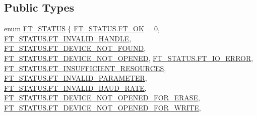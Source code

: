 \subsection*{Public Types}
\begin{DoxyCompactItemize}
\item 
enum \mbox{\hyperlink{class_f_t_d2_x_x___n_e_t_1_1_f_t_d_i_aabe20ad905cc4ccc1e35dd5b877d9a83}{F\+T\+\_\+\+S\+T\+A\+T\+US}} \{ \newline
\mbox{\hyperlink{class_f_t_d2_x_x___n_e_t_1_1_f_t_d_i_aabe20ad905cc4ccc1e35dd5b877d9a83a457bfd017cd07899da559fbfb31f0921}{F\+T\+\_\+\+S\+T\+A\+T\+U\+S.\+F\+T\+\_\+\+OK}} = 0, 
\mbox{\hyperlink{class_f_t_d2_x_x___n_e_t_1_1_f_t_d_i_aabe20ad905cc4ccc1e35dd5b877d9a83a0194e414d359539c11196a6479366791}{F\+T\+\_\+\+S\+T\+A\+T\+U\+S.\+F\+T\+\_\+\+I\+N\+V\+A\+L\+I\+D\+\_\+\+H\+A\+N\+D\+LE}}, 
\mbox{\hyperlink{class_f_t_d2_x_x___n_e_t_1_1_f_t_d_i_aabe20ad905cc4ccc1e35dd5b877d9a83a3e5bc5361c266ec83f68d8e151ef4830}{F\+T\+\_\+\+S\+T\+A\+T\+U\+S.\+F\+T\+\_\+\+D\+E\+V\+I\+C\+E\+\_\+\+N\+O\+T\+\_\+\+F\+O\+U\+ND}}, 
\mbox{\hyperlink{class_f_t_d2_x_x___n_e_t_1_1_f_t_d_i_aabe20ad905cc4ccc1e35dd5b877d9a83a60e95d7e0678746e6004b3a0b14716d8}{F\+T\+\_\+\+S\+T\+A\+T\+U\+S.\+F\+T\+\_\+\+D\+E\+V\+I\+C\+E\+\_\+\+N\+O\+T\+\_\+\+O\+P\+E\+N\+ED}}, 
\newline
\mbox{\hyperlink{class_f_t_d2_x_x___n_e_t_1_1_f_t_d_i_aabe20ad905cc4ccc1e35dd5b877d9a83afbdb080c426a9eaff4e44934a378e1ec}{F\+T\+\_\+\+S\+T\+A\+T\+U\+S.\+F\+T\+\_\+\+I\+O\+\_\+\+E\+R\+R\+OR}}, 
\mbox{\hyperlink{class_f_t_d2_x_x___n_e_t_1_1_f_t_d_i_aabe20ad905cc4ccc1e35dd5b877d9a83acbb2403dab8d7f19c1226018647137a2}{F\+T\+\_\+\+S\+T\+A\+T\+U\+S.\+F\+T\+\_\+\+I\+N\+S\+U\+F\+F\+I\+C\+I\+E\+N\+T\+\_\+\+R\+E\+S\+O\+U\+R\+C\+ES}}, 
\mbox{\hyperlink{class_f_t_d2_x_x___n_e_t_1_1_f_t_d_i_aabe20ad905cc4ccc1e35dd5b877d9a83a1e0cdaa04c44be619e70da40e360ee3d}{F\+T\+\_\+\+S\+T\+A\+T\+U\+S.\+F\+T\+\_\+\+I\+N\+V\+A\+L\+I\+D\+\_\+\+P\+A\+R\+A\+M\+E\+T\+ER}}, 
\mbox{\hyperlink{class_f_t_d2_x_x___n_e_t_1_1_f_t_d_i_aabe20ad905cc4ccc1e35dd5b877d9a83ac9b47f95bbe112f57b9439d00d1dd97e}{F\+T\+\_\+\+S\+T\+A\+T\+U\+S.\+F\+T\+\_\+\+I\+N\+V\+A\+L\+I\+D\+\_\+\+B\+A\+U\+D\+\_\+\+R\+A\+TE}}, 
\newline
\mbox{\hyperlink{class_f_t_d2_x_x___n_e_t_1_1_f_t_d_i_aabe20ad905cc4ccc1e35dd5b877d9a83add6b2d90ffe7f2b1ae60b7842a372c89}{F\+T\+\_\+\+S\+T\+A\+T\+U\+S.\+F\+T\+\_\+\+D\+E\+V\+I\+C\+E\+\_\+\+N\+O\+T\+\_\+\+O\+P\+E\+N\+E\+D\+\_\+\+F\+O\+R\+\_\+\+E\+R\+A\+SE}}, 
\mbox{\hyperlink{class_f_t_d2_x_x___n_e_t_1_1_f_t_d_i_aabe20ad905cc4ccc1e35dd5b877d9a83a2cb20cdf9d8a5e22e7bcafb34362e41d}{F\+T\+\_\+\+S\+T\+A\+T\+U\+S.\+F\+T\+\_\+\+D\+E\+V\+I\+C\+E\+\_\+\+N\+O\+T\+\_\+\+O\+P\+E\+N\+E\+D\+\_\+\+F\+O\+R\+\_\+\+W\+R\+I\+TE}}, 

\end{DoxyCompactItemize}
